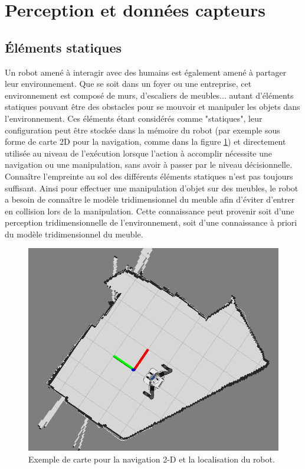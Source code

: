 \documentclass[a4paper,11pt,twoside]{StyleThese}
\begin{document}


\section{Perception et données capteurs}
\label{sec:collecte}
\subsection{Éléments statiques}
Un robot amené à interagir avec des humains est également amené à partager leur environnement. Que se soit dans un foyer ou une entreprise, cet environnement est composé de murs, d'escaliers de meubles... autant d'éléments statiques pouvant être des obstacles pour se mouvoir et manipuler les objets dans l'environnement. Ces éléments étant considérés comme "statiques", leur configuration peut être stockée dans la mémoire du robot (par exemple sous forme de carte 2D pour la navigation, comme dans la figure \ref{fig:map}) et directement utilisée au niveau de l'exécution lorsque l'action à accomplir nécessite une navigation ou une manipulation, sans avoir à passer par le niveau décisionnelle. Connaître l'empreinte au sol des différents éléments statiques n'est pas toujours suffisant. Ainsi pour effectuer une manipulation d'objet sur des meubles, le robot a besoin de connaître le modèle tridimensionnel du meuble afin d'éviter d'entrer en collision lors de la manipulation. Cette connaissance peut provenir soit d'une perception tridimensionnelle de l'environnement, soit d'une connaissance à priori du modèle tridimensionnel du meuble.

\begin{figure}[ht!]
 \centering
  \includegraphics[width=0.59\linewidth]{./img/Map2d.png} 
  \caption {Exemple de carte pour la navigation 2-D et la localisation du robot.}
  \label{fig:map}
\end{figure}
\end{document}
